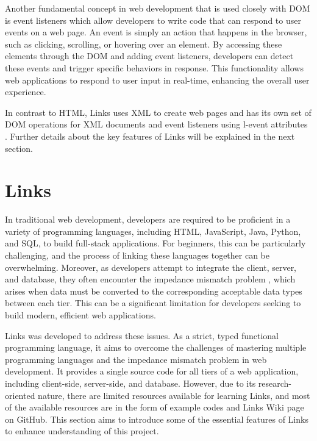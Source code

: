 \documentclass[logo,bsc,singlespacing,parskip]{infthesis}
\begin{document}
Another fundamental concept in web development that is used closely with DOM is event listeners \cite{event_listener} which allow developers to write code that can respond to user events on a web page. An event is simply an action that happens in the browser, such as clicking, scrolling, or hovering over an element. By accessing these elements through the DOM and adding event listeners, developers can detect these events and trigger specific behaviors in response. This functionality allows web applications to respond to user input in real-time, enhancing the overall user experience.

In contrast to HTML, Links uses XML to create web pages and has its own set of DOM operations for XML documents and event listeners using l-event attributes \cite{links}. Further details about the key features of Links will be explained in the next section.

\section{Links}
\label{section:links}

In traditional web development, developers are required to be proficient in a variety of programming languages, including HTML, JavaScript, Java, Python, and SQL, to build full-stack applications. For beginners, this can be particularly challenging, and the process of linking these languages together can be overwhelming. Moreover, as developers attempt to integrate the client, server, and database, they often encounter the impedance mismatch problem \cite{links}, which arises when data must be converted to the corresponding acceptable data types between each tier. This can be a significant limitation for developers seeking to build modern, efficient web applications.

Links was developed to address these issues. As a strict, typed functional programming language, it aims to overcome the challenges of mastering multiple programming languages and the impedance mismatch problem in web development. It provides a single source code for all tiers of a web application, including client-side, server-side, and database. However, due to its research-oriented nature, there are limited resources available for learning Links, and most of the available resources are in the form of example codes and Links Wiki page \cite{links_wiki} on GitHub. This section aims to introduce some of the essential features of Links to enhance understanding of this project.
\end{document}
